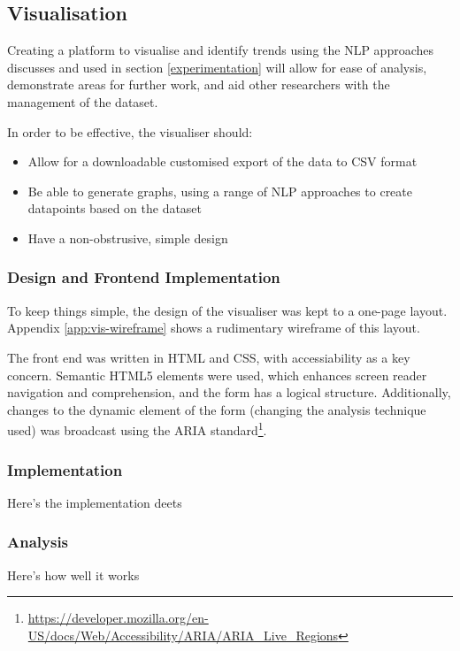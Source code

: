 \subsection{Visualisation}

Creating a platform to visualise and identify trends using the NLP approaches discusses and used in section \ref{experimentation} will allow for ease of analysis, demonstrate areas for further work, and aid other researchers with the management of the dataset.

In order to be effective, the visualiser should:
\begin{itemize}
	\item Allow for a downloadable customised export of the data to CSV format
	\item Be able to generate graphs, using a range of NLP approaches to create datapoints based on the dataset
	\item Have a non-obstrusive, simple design	
\end{itemize}


\subsubsection{Design and Frontend Implementation}
To keep things simple, the design of the visualiser was kept to a one-page layout. Appendix \ref{app:vis-wireframe} shows a rudimentary wireframe of this layout. 

The front end was written in HTML and CSS, with accessiability as a key concern. Semantic HTML5 elements were used, which enhances screen reader navigation and comprehension, and the form has a logical structure. Additionally, changes to the dynamic element of the form (changing the analysis technique used) was broadcast using the ARIA standard\footnote{\url{https://developer.mozilla.org/en-US/docs/Web/Accessibility/ARIA/ARIA_Live_Regions}}.

\subsubsection{Implementation}
Here's the implementation deets

\subsubsection{Analysis}
Here's how well it works
